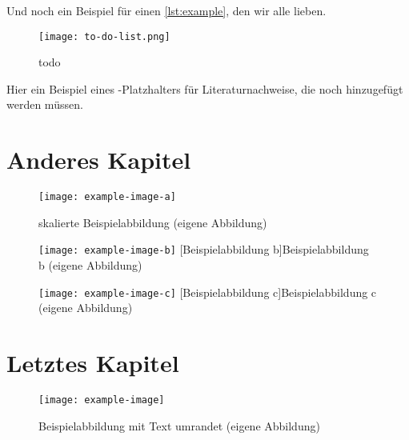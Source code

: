 \noindent Und noch ein Beispiel für einen \cref{lst:example}, den wir alle lieben.

\begin{figure}[!ht]
    \centering
    \texttt{[image: to-do-list.png]}
    \caption{todo}
    \label{fig:todo}
\end{figure}

\noindent Hier ein Beispiel eines \textcite{todo}-Platzhalters für Literaturnachweise, die noch hinzugefügt werden müssen.

\clearpage

\chapter{Anderes Kapitel}\label{chap:another}

\begin{figure}[!ht]
    \centering
    \texttt{[image: example-image-a]}
    \captionsetup{width=1.0\textwidth}
    \caption[skalierte Beispielabbildung]{skalierte Beispielabbildung (eigene Abbildung)}
    \label{fig:scaledexampleimagea}
\end{figure}

\begin{figure}[!ht]
\centering
    \begin{minipage}[c]{.475\textwidth}
    \centering
        \texttt{[image: example-image-b]}
        [Beispielabbildung b]{Beispielabbildung b (eigene Abbildung)}
        \label{fig:horizontalalignedimageb}
    \end{minipage}\hspace{.025\textwidth}
    \begin{minipage}[c]{.475\textwidth}
        \centering
        \texttt{[image: example-image-c]}
        [Beispielabbildung c]{Beispielabbildung c (eigene Abbildung)}
        \label{fig:horizontalalignedimagec}
    \end{minipage}
\end{figure}

\clearpage

\chapter{Letztes Kapitel}\label{chap:last}

\lipsum[1]

\begin{wrapfigure}{l}{0.4\textwidth}
    \centering
    \texttt{[image: example-image]}
    \captionsetup{width=0.9\linewidth}
    \caption[Beispielabbildung mit Text umrandet]{Beispielabbildung mit Text umrandet (eigene Abbildung)}
    \label{fig:textwrappedaroundexampleimage}
\end{wrapfigure}

